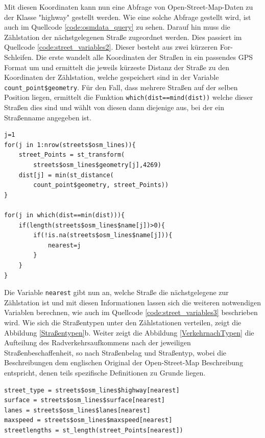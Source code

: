 \documentclass[a4paper,12pt]{thesis}
\begin{document}
Mit diesen Koordinaten kann nun eine Abfrage von Open-Street-Map-Daten zu der Klasse "highway" gestellt werden. Wie eine solche Abfrage gestellt wird, ist auch im Quellcode \ref{code:osmdata_query} zu sehen. Darauf hin muss die Zählstation der nächstgelegenen Straße zugeordnet werden. Dies passiert im Quellcode \ref{code:street_variables2}. Dieser besteht aus zwei kürzeren For-Schleifen. Die erste wandelt alle Koordinaten der Straßen in ein passendes GPS Format um und ermittelt die jeweils kürzeste Distanz der Straße zu den Koordinaten der Zählstation, welche gespeichert sind in der Variable \lstinline|count_point$geometry|. Für den Fall, dass mehrere Straßen auf der selben Position liegen, ermittelt die Funktion \lstinline|which(dist==mind(dist))| welche dieser Straßen dies sind und wählt von diesen dann diejenige aus, bei der ein Straßenname angegeben ist.

\begin{minipage}{\linewidth}
\begin{lstlisting}[caption={Zuordnung zur nächsten Straße},label=code:street_variables2]
j=1
for(j in 1:nrow(streets$osm_lines)){
	street_Points = st_transform(
		streets$osm_lines$geometry[j],4269)
	dist[j] = min(st_distance(
		count_point$geometry, street_Points))
}
	
for(j in which(dist==min(dist))){
	if(length(streets$osm_lines$name[j])>0){
		if(!is.na(streets$osm_lines$name[j])){
			nearest=j
		}
	}
}
\end{lstlisting}
\end{minipage}

Die Variable \lstinline|nearest| gibt nun an, welche Straße die nächstgelegene zur Zählstation ist und mit diesen Informationen lassen sich die weiteren notwendigen Variablen berechnen, wie auch im Quellcode \ref{code:street_variables3} beschrieben wird. Wie sich die Straßentypen unter den Zählstationen verteilen, zeigt die Abbildung \ref{Straßentypen}b. Weiter zeigt die Abbildung \ref{VerkehrnachTypen} die Aufteilung des Radverkehrsaufkommens nach der jeweiligen Straßenbeschaffenheit, so nach Straßenbelag und Straßentyp, wobei die Beschreibungen dem englischen Original der Open-Street-Map Beschreibung entspricht, denen teils spezifische Definitionen zu Grunde liegen.

\begin{minipage}{\linewidth}
\begin{lstlisting}[caption={Berechnung der Straßenvariablen},label=code:street_variables3]
street_type = streets$osm_lines$highway[nearest]
surface = streets$osm_lines$surface[nearest]
lanes = streets$osm_lines$lanes[nearest]
maxspeed = streets$osm_lines$maxspeed[nearest]
streetlengths = st_length(street_Points[nearest])
\end{lstlisting}
\end{minipage}
\end{document}
